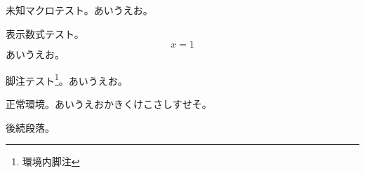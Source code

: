 \documentclass[pdflatex]{jlreq}
\begin{document}
\begin{jlreqparagraph}
未知マクロテスト。\thismacroisundefined あいうえお。
\end{jlreqparagraph}
\begin{jlreqparagraph}
表示数式テスト。
\[ x=1 \]
あいうえお。
\end{jlreqparagraph}
\begin{jlreqparagraph}
脚注テスト\footnote{環境内脚注}。あいうえお。
\end{jlreqparagraph}
\begin{jlreqparagraph}
正常環境。あいうえおかきくけこさしすせそ。
\end{jlreqparagraph}
後続段落。
\end{document}
